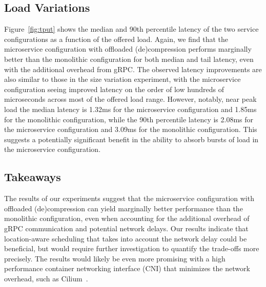 \subsection{Load Variations}
Figure~\ref{fig:tput} shows the median and 90th percentile latency of the two service configurations as a function of the offered load.
Again, we find that the microservice configuration with offloaded (de)compression performs marginally better than the monolithic configuration for both median and tail latency, even with the additional overhead from gRPC.
The observed latency improvements are also similar to those in the size variation experiment, with the microservice configuration seeing improved latency on the order of low hundreds of microseconds across most of the offered load range.
However, notably, near peak load the median latency is 1.32ms for the microservice configuration and 1.85ms for the monolithic configuration, while the 90th percentile latency is 2.08ms for the microservice configuration and 3.09ms for the monolithic configuration.
This suggests a potentially significant benefit in the ability to absorb bursts of load in the microservice configuration.

\subsection{Takeaways}
The results of our experiments suggest that the microservice configuration with offloaded (de)compression can yield marginally better performance than the monolithic configuration, even when accounting for the additional overhead of gRPC communication and potential network delays. Our results indicate that location-aware scheduling that takes into account the network delay could be beneficial, but would require further investigation to quantify the trade-offs more precisely. The results would likely be even more promising with a high performance container networking interface (CNI) that minimizes the network overhead, such as Cilium~\cite{cilium}.
